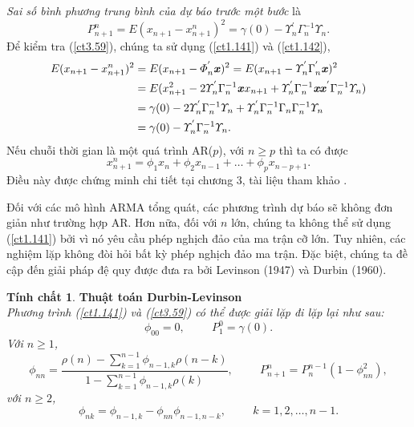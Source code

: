 \documentclass[12pt, a4paper,oneside]{book}
\theoremstyle{definition}
\newtheorem{tc}[theo]{Tính chất}
\begin{document}
\textit{Sai số bình phương trung bình của dự báo trước một bước} là
\begin{equation}
P_{n+1}^{n} = E (x_{n+1} - x_{n+1}^{n})^{2} = \gamma(0) - \varUpsilon^{'}_{n}\Gamma_n^{-1}\varUpsilon_{n}. \label{ct3.59}
\end{equation}	
Để kiểm tra (\ref{ct3.59}), chúng ta sử dụng (\ref{ct1.141}) và (\ref{ct1.142}),
\begin{align*}
E(x_{n+1}- x_{n+1}^{n})^{2} &= E(x_{n+1} - \varPhi_{n}^{'}\textbf{\textit{x}})^{2}= E(x_{n+1} - \varUpsilon_n^{'}\Gamma^{'}_{n}\textbf{\textit{x}})^{2}\\& = E(x_{n+1}^{2} - 2\varUpsilon^{'}_{n}\Gamma^{-1}_{n}\textbf{\textit{x}}x_{n+1} + \varUpsilon^{'}_{n}\Gamma^{-1}_{n}\textbf{\textit{xx}}^{'}\Gamma^{-1}_{n}\varUpsilon_{n})\\ & =\gamma(0) -2\varUpsilon^{'}_{n}\Gamma^{-1}_{n}\varUpsilon_n+ \varUpsilon^{'}_{n}\Gamma^{-1}_{n}\Gamma_n\Gamma_n^{-1}\varUpsilon_n\\ & =\gamma(0)-\varUpsilon_n^{'}\Gamma_n^{-1}\varUpsilon_n.
\end{align*}
Nếu chuỗi thời gian là một quá trình AR($p$), với $n\geq p$ thì ta có được
\begin{equation}
x_{n+1}^{n}=\phi_1x_n+\phi_2x_{n-1}+\dots+\phi_px_{n-p+1}. \label{ct3.60}
\end{equation}
Điều này được chứng minh chi tiết tại chương 3, tài liệu tham khảo \cite{1}.

Đối với các mô hình ARMA tổng quát, các phương trình dự báo sẽ không đơn giản như trường hợp AR. Hơn nữa, đối với $n$ lớn, chúng ta không thể sử dụng (\ref{ct1.141}) bởi vì nó yêu cầu phép nghịch đảo của ma trận cỡ lớn. Tuy nhiên, các nghiệm lặp không đòi hỏi bất kỳ phép nghịch đảo ma trận. Đặc biệt, chúng ta đề cập đến giải pháp đệ quy được đưa ra bởi Levinson (1947) và Durbin (1960).
\begin{tc}\cite{1} \textbf{Thuật toán  Durbin-Levinson}\\
	\textit{Phương trình (\ref{ct1.141}) và (\ref{ct3.59}) có thể được giải lặp đi lặp lại như sau: 
		\begin{equation}
		\phi_{00}= 0, \hspace{1cm} P_{1}^{0}= \gamma(0). \label{ct1.144}
		\end{equation} 
		Với $n\geq 1$,
		\begin{equation}
		\phi_{nn} = \dfrac{\rho(n) - \sum_{k=1}^{n-1}\phi_{n-1,k}\rho
			(n-k)}{1- \sum_{k=1}^{n-1}\phi_{n-1,k}\rho(k)}, \hspace{1cm}  P_{n+1}^{n}= P_{n}^{n-1}(1 - \phi_{nn}^{2}), \label{ct1.145}
		\end{equation}
		với $n\geq 2$,
		\begin{equation}
		\phi_{nk} = \phi_{n-1,k}- \phi_{nn}\phi_{n-1,n-k}, \hspace{1cm}  k=1, 2, \dots, n-1. \label{ct1.146}
		\end{equation}}
\end{tc}
\end{document}
